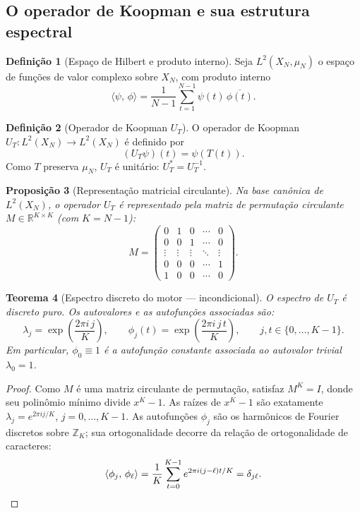 \documentclass[12pt,a4paper]{article}
\newtheorem{theorem}{Teorema}[section]
\newtheorem{proposition}[theorem]{Proposição}
\theoremstyle{definition}
\newtheorem{definition}[theorem]{Definição}
\newcommand{\Z}{\mathbb{Z}}
\newcommand{\R}{\mathbb{R}}
\newcommand{\ip}[2]{\langle #1,\, #2 \rangle}
\begin{document}
	\subsection{O operador de Koopman e sua estrutura espectral}
	
	\begin{definition}[Espaço de Hilbert e produto interno]
		Seja $L^2(X_N, \mu_N)$ o espaço de funções de valor complexo sobre
		$X_N$, com produto interno
		\[
		\ip{\psi}{\phi} = \frac{1}{N-1}\sum_{t=1}^{N-1} \psi(t)\,\overline{\phi(t)}.
		\]
	\end{definition}
	
	\begin{definition}[Operador de Koopman $U_T$]
		\label{def:koopman}
		O operador de Koopman $U_T: L^2(X_N) \to L^2(X_N)$ é definido por
		\[
		(U_T\psi)(t) = \psi(T(t)).
		\]
		Como $T$ preserva $\mu_N$, $U_T$ é unitário: $U_T^* = U_T^{-1}$.
	\end{definition}
	
	\begin{proposition}[Representação matricial circulante]
		\label{prop:circulante}
		Na base canônica de $L^2(X_N)$, o operador $U_T$ é representado pela
		matriz de permutação circulante $M \in \R^{K\times K}$ (com $K = N-1$):
		\[
		M = \begin{pmatrix}
			0 & 1 & 0 & \cdots & 0 \\
			0 & 0 & 1 & \cdots & 0 \\
			\vdots & \vdots & \vdots & \ddots & \vdots \\
			0 & 0 & 0 & \cdots & 1 \\
			1 & 0 & 0 & \cdots & 0
		\end{pmatrix}.
		\]
	\end{proposition}
	
	\begin{theorem}[Espectro discreto do motor — incondicional]
		\label{thm:espectro}
		O espectro de $U_T$ é discreto puro. Os autovalores e as autofunções
		associadas são:
		\[
		\lambda_j = \exp\!\left(\frac{2\pi i\, j}{K}\right),\qquad
		\phi_j(t) = \exp\!\left(\frac{2\pi i\, j\, t}{K}\right),\qquad
		j,t \in \{0,\ldots,K-1\}.
		\]
		Em particular, $\phi_0 \equiv 1$ é a autofunção constante associada ao
		autovalor trivial $\lambda_0 = 1$.
	\end{theorem}
	
	\begin{proof}
		Como $M$ é uma matriz circulante de permutação, satisfaz $M^K = I$,
		donde seu polinômio mínimo divide $x^K - 1$. As raízes de $x^K - 1$
		são exatamente $\lambda_j = e^{2\pi ij/K}$, $j = 0,\ldots,K-1$. As
		autofunções $\phi_j$ são os harmônicos de Fourier discretos sobre
		$\Z_K$; sua ortogonalidade decorre da relação de ortogonalidade de
		caracteres:
		\[
		\ip{\phi_j}{\phi_\ell} = \frac{1}{K}\sum_{t=0}^{K-1}
		e^{2\pi i(j-\ell)t/K} = \delta_{j\ell}.\qedhere
		\]
	\end{proof}
	
\end{document}
